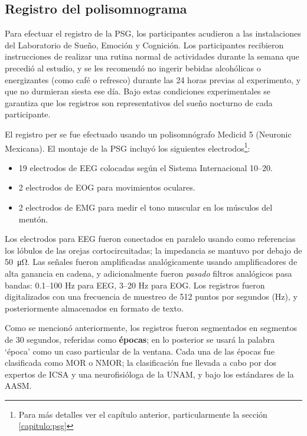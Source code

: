 \documentclass[12pt,letterpaper]{book}
\begin{document}

\subsection{Registro del polisomnograma}

Para efectuar el registro de la PSG, los participantes acudieron a las instalaciones del Laboratorio de Sueño, Emoción y Cognición. 
%
Los participantes recibieron instrucciones de realizar una rutina normal de actividades durante la semana que precedió al estudio, y se les recomendó no ingerir bebidas alcohólicas o energizantes (como café o refresco) durante las 24 horas previas al experimento, y que no durmieran siesta ese día.
%
Bajo estas condiciones experimentales se garantiza que los registros son representativos del sueño nocturno de cada participante.

El registro per se fue efectuado usando un polisomnógrafo Medicid 5 (Neuronic Mexicana). El montaje de la PSG incluyó los siguientes electrodos\footnote{Para más detalles ver el capítulo anterior, particularmente la sección \ref{capitulo:psg}}:
\begin{itemize}
\item 19 electrodos de EEG colocadas según el Sistema Internacional 10--20.
\item 2 electrodos de EOG para movimientos oculares.
\item 2 electrodos de EMG para medir el tono muscular en los músculos del mentón.
\end{itemize}

Los electrodos para EEG fueron conectados en paralelo usando como referencias los lóbulos de las orejas cortocircuitadas; la impedancia se mantuvo por debajo de \SI{50}{\micro\ohm}.
%
Las señales fueron amplificadas analógicamente usando amplificadores de alta ganancia en cadena, y adicionalmente fueron \textit{pasado} filtros analógicos pasa bandas: 0.1--100 Hz para EEG, 3--20 Hz para EOG. 
%
Los registros fueron digitalizados con una frecuencia de muestreo de 512 puntos por segundos (Hz), y posteriormente almacenados en formato de texto.

Como se mencionó anteriormente, los registros fueron segmentados en segmentos de 30 segundos, referidas como \textbf{épocas}; en lo posterior se usará la palabra `época' como un caso particular de la ventana.
%
Cada una de las épocas fue clasificada como MOR o NMOR; la clasificación fue llevada a cabo por dos expertos de ICSA y una neurofisióloga de la UNAM, y bajo los estándares de la AASM.
\end{document}
